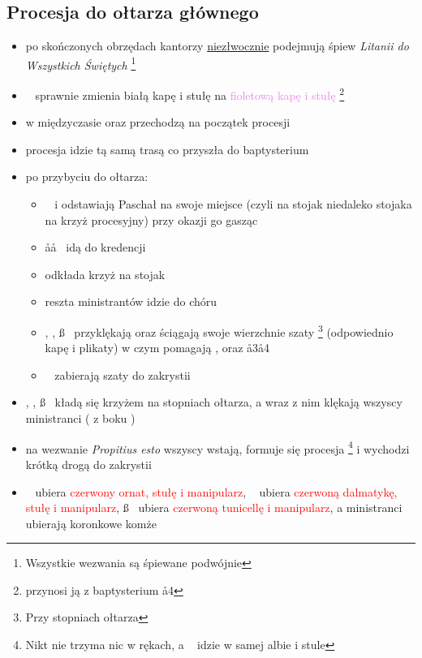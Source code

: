 \subsection{Procesja do ołtarza głównego}
\begin{itemize}
	\item po skończonych obrzędach kantorzy \underline{niezłwocznie} podejmują
	      śpiew \textit{Litanii do Wszystkich Świętych} \footnote{Wszystkie
		      wezwania są śpiewane podwójnie}
	\item \ii~ sprawnie zmienia \textcolor{black!50}{białą kapę i stułę} na
	      \textcolor{violet}{fioletową kapę i stułę} \footnote{przynosi ją z
		      baptysterium \aa4}
	\item w międzyczasie \paschal oraz  przechodzą na początek procesji
	\item procesja idzie tą samą trasą co przyszła do baptysterium
	\item po przybyciu do ołtarza:
	      \begin{itemize}
		      \item \paschal~ i  odstawiają Paschał na swoje miejsce (czyli
		            na stojak niedaleko stojaka na krzyż procesyjny) przy okazji
		            go gasząc
		      \item \aa\aa~ idą do kredencji
		      \item {} odkłada krzyż na stojak
		      \item reszta ministrantów idzie do chóru
		      \item \ii, \dd, \ss~ przyklękają oraz ściągają swoje wierzchnie
		            szaty \footnote{Przy stopniach ołtarza} (odpowiednio kapę i
		            plikaty) w czym pomagają ,  oraz \aa3\aa4
		      \item \zz\zz~ zabierają szaty do zakrystii
	      \end{itemize}
	\item \ii, \dd, \ss~ kładą się krzyżem na stopniach ołtarza, a wraz z nim
	      klękają wszyscy ministranci ( z boku \dd)
	\item na wezwanie \textit{Propitius esto} wszyscy wstają, formuje się
	      procesja \footnote{Nikt nie trzyma nic w rękach, a \ii~ idzie w samej
		      albie i stule} i wychodzi krótką drogą do zakrystii
	\item \ii~ ubiera \textcolor{red}{czerwony ornat, stułę i manipularz}, \dd~
	      ubiera \textcolor{red}{czerwoną dalmatykę, stułę i manipularz},
	      \ss~ ubiera \textcolor{red}{czerwoną tunicellę i manipularz}, a
	      ministranci ubierają koronkowe komże
\end{itemize}
